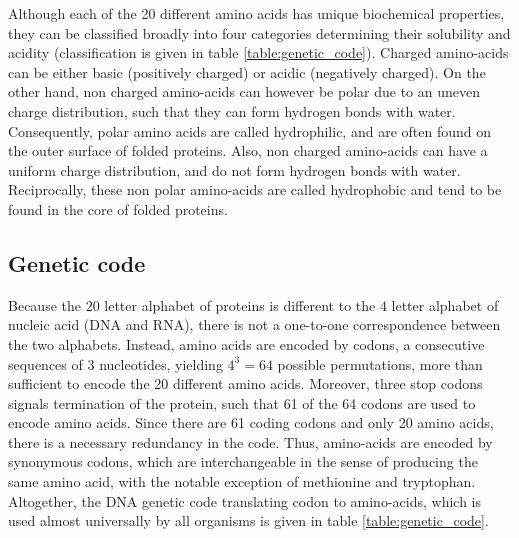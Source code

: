 Although each of the 20 different amino acids has unique biochemical properties, they can be classified broadly into four categories determining their solubility and acidity (classification is given in table \ref{table:genetic_code}).
Charged amino-acids can be either basic (positively charged) or acidic (negatively charged).
On the other hand, non charged amino-acids can however be polar due to an uneven charge distribution, such that they can form hydrogen bonds with water.
Consequently, polar amino acids are called hydrophilic, and are often found on the outer surface of folded proteins.
Also, non charged amino-acids can have a uniform charge distribution, and do not form hydrogen bonds with water.
Reciprocally, these non polar amino-acids are called hydrophobic and tend to be found in the core of folded proteins.

\subsection{Genetic code}

Because the $20$ letter alphabet of proteins is different to the $4$ letter alphabet of nucleic acid (DNA and RNA), there is not a one-to-one correspondence between the two alphabets.
Instead, amino acids are encoded by codons, a consecutive sequences of 3 nucleotides, yielding $4^3=64$ possible permutations, more than sufficient to encode the 20 different amino acids.
Moreover, three stop codons signals termination of the protein, such that 61 of the 64 codons are used to encode amino acids.
Since there are 61 coding codons and only 20 amino acids, there is a necessary redundancy in the code.
Thus, amino-acids are encoded by synonymous codons, which are interchangeable in the sense of producing the same amino acid, with the notable exception of methionine and tryptophan.
Altogether, the DNA genetic code translating codon to amino-acids, which is used almost universally by all organisms is given in table \ref{table:genetic_code}.


